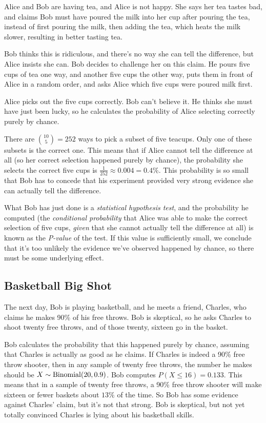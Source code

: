 Alice and Bob are having tea, and Alice is not happy. She says her tea tastes bad, and claims Bob must have poured the milk into her cup after pouring the tea, instead of first pouring the milk, then adding the tea, which heats the milk slower, resulting in better tasting tea.

Bob thinks this is ridiculous, and there's no way she can tell the difference, but Alice insists she can. Bob decides to challenge her on this claim. He pours five cups of tea one way, and another five cups the other way, puts them in front of Alice in a random order, and asks Alice which five cups were poured milk first.

Alice picks out the five cups correctly. Bob can't believe it. He thinks she must have just been lucky, so he calculates the probability of Alice selecting correctly purely by chance.

There are $\binom{10}{5} = 252$ ways to pick a subset of five teacups. Only one of these subsets is the correct one. This means that if Alice cannot tell the difference at all (so her correct selection happened purely by chance), the probability she selects the correct five cups is $\frac{1}{252} \approx 0.004 = 0.4\%$. This probability is so small that Bob has to concede that his experiment provided very strong evidence she can actually tell the difference.

What Bob has just done is a \emph{statistical hypothesis test}, and the probability he computed (the \emph{conditional probability} that Alice was able to make the correct selection of five cups, \emph{given} that she cannot actually tell the difference at all) is known as the \emph{P-value} of the test. If this value is sufficiently small, we conclude that it's too unlikely the evidence we've observed happened by chance, so there must be some underlying effect.

\subsection*{Basketball Big Shot}

The next day, Bob is playing basketball, and he meets a friend, Charles, who claims he makes 90\% of his free throws. Bob is skeptical, so he asks Charles to shoot twenty free throws, and of those twenty, sixteen go in the basket.

Bob calculates the probability that this happened purely by chance, assuming that Charles is actually as good as he claims. If Charles is indeed a 90\% free throw shooter, then in any sample of twenty free throws, the number he makes should be $X \sim \operatorname{Binomial}(20,0.9)$. Bob computes $P(X \leq 16) = 0.133$. This means that in a sample of twenty free throws, a 90\% free throw shooter will make sixteen or fewer baskets about $13\%$ of the time. So Bob has some evidence against Charles' claim, but it's not that strong. Bob is skeptical, but not yet totally convinced Charles is lying about his basketball skills.

